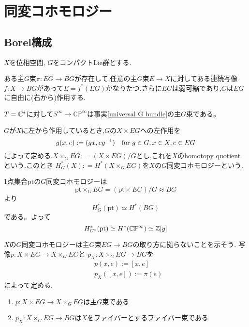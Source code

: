 \section{同変コホモロジー}
\subsection{Borel構成}

$X$を位相空間, $G$をコンパクトLie群とする.

\begin{fact}\label{universal G bundle}
  ある主$G$束$\pi\colon EG\rightarrow BG$が存在して,任意の主$G$束$E\rightarrow X$に対してある連続写像$f\colon X\rightarrow BG$があって$E=f^*(EG)$がなりたつ.さらに$EG$は弱可縮であり,$G$は$EG$に自由に(右から)作用する.
\end{fact}

\begin{eg}
  $T=\mathbb{C}^*$に対して$S^\infty\rightarrow \mathbb{CP}^\infty$は事実\ref{universal G bundle}の主$G$束である。
\end{eg}

\begin{defin}
  $G$が$X$に左から作用しているとき,$G$の$X\times EG$への左作用を
  \[
  g(x, e) := (gx, eg^{-1}) \quad \text{for } g\in G, x\in X, e\in EG 
  \]
  によって定める.$X\times_GEG\colon=(X\times EG)/G$とし,これを$X$のhomotopy quotient という.このとき
  $H^*_G(X)\colon=H^*(X\times_GEG)$を$X$の$G$同変コホモロジーという.
\end{defin}

\begin{eg}
  1点集合$\text{pt}$の$G$同変コホモロジーは
  \[
  \text{pt}\times_GEG=(\text{pt}\times EG)/G\approx BG
  \]
  より
  \[
  H^*_G(\text{pt})\simeq H^*(BG)
  \]
  である。よって
  \[
  H^*_{C^*}(\text{pt})\simeq H^*(\mathbb{CP}^\infty)\simeq \mathbb{Z}[y]
  \]
\end{eg}


$X$の$G$同変コホモロジーは主$G$束$EG\rightarrow BG$の取り方に拠らないことを示そう.
写像$p\colon X\times EG\rightarrow X\times_GEG$と $p_X\colon X\times_GEG\rightarrow BG$を
\begin{align*}
  &p(x, e):=[x,e]\\
  &p_X([x,e]):=\pi(e)
\end{align*}
によって定める.

\begin{prop}
  \:
  \begin{enumerate}
    \item $p\colon X\times EG\rightarrow X\times_GEG$は主$G$束である
    \item $p_X\colon X\times_GEG\rightarrow BG$は$X$をファイバーとするファイバー束である
  \end{enumerate}
\end{prop}


